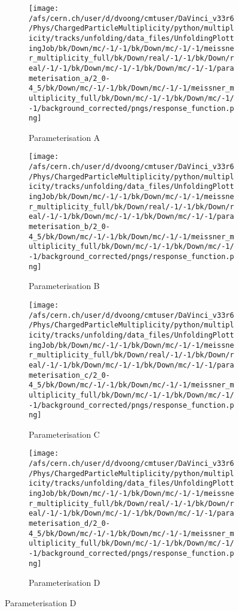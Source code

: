 \begin{figure}[h]
	\begin{subfigure}{0.49\textwidth}
		\texttt{[image: /afs/cern.ch/user/d/dvoong/cmtuser/DaVinci\_v33r6/Phys/ChargedParticleMultiplicity/python/multiplicity/tracks/unfolding/data\_files/UnfoldingPlottingJob/bk/Down/mc/-1/-1/bk/Down/mc/-1/-1/meissner\_multiplicity\_full/bk/Down/real/-1/-1/bk/Down/real/-1/-1/bk/Down/mc/-1/-1/bk/Down/mc/-1/-1/parameterisation\_a/2\_0-4\_5/bk/Down/mc/-1/-1/bk/Down/mc/-1/-1/meissner\_multiplicity\_full/bk/Down/mc/-1/-1/bk/Down/mc/-1/-1/background\_corrected/pngs/response\_function.png]}
		\caption{Parameterisation A}
	\end{subfigure}
	\begin{subfigure}{0.49\textwidth}
		\texttt{[image: /afs/cern.ch/user/d/dvoong/cmtuser/DaVinci\_v33r6/Phys/ChargedParticleMultiplicity/python/multiplicity/tracks/unfolding/data\_files/UnfoldingPlottingJob/bk/Down/mc/-1/-1/bk/Down/mc/-1/-1/meissner\_multiplicity\_full/bk/Down/real/-1/-1/bk/Down/real/-1/-1/bk/Down/mc/-1/-1/bk/Down/mc/-1/-1/parameterisation\_b/2\_0-4\_5/bk/Down/mc/-1/-1/bk/Down/mc/-1/-1/meissner\_multiplicity\_full/bk/Down/mc/-1/-1/bk/Down/mc/-1/-1/background\_corrected/pngs/response\_function.png]}
		\caption{Parameterisation B}
	\end{subfigure}
	\begin{subfigure}{0.49\textwidth}
		\texttt{[image: /afs/cern.ch/user/d/dvoong/cmtuser/DaVinci\_v33r6/Phys/ChargedParticleMultiplicity/python/multiplicity/tracks/unfolding/data\_files/UnfoldingPlottingJob/bk/Down/mc/-1/-1/bk/Down/mc/-1/-1/meissner\_multiplicity\_full/bk/Down/real/-1/-1/bk/Down/real/-1/-1/bk/Down/mc/-1/-1/bk/Down/mc/-1/-1/parameterisation\_c/2\_0-4\_5/bk/Down/mc/-1/-1/bk/Down/mc/-1/-1/meissner\_multiplicity\_full/bk/Down/mc/-1/-1/bk/Down/mc/-1/-1/background\_corrected/pngs/response\_function.png]}
		\caption{Parameterisation C}
	\end{subfigure}
	\begin{subfigure}{0.49\textwidth}
		\texttt{[image: /afs/cern.ch/user/d/dvoong/cmtuser/DaVinci\_v33r6/Phys/ChargedParticleMultiplicity/python/multiplicity/tracks/unfolding/data\_files/UnfoldingPlottingJob/bk/Down/mc/-1/-1/bk/Down/mc/-1/-1/meissner\_multiplicity\_full/bk/Down/real/-1/-1/bk/Down/real/-1/-1/bk/Down/mc/-1/-1/bk/Down/mc/-1/-1/parameterisation\_d/2\_0-4\_5/bk/Down/mc/-1/-1/bk/Down/mc/-1/-1/meissner\_multiplicity\_full/bk/Down/mc/-1/-1/bk/Down/mc/-1/-1/background\_corrected/pngs/response\_function.png]}
		\caption{Parameterisation D}

\end{subfigure}
\end{figure}
